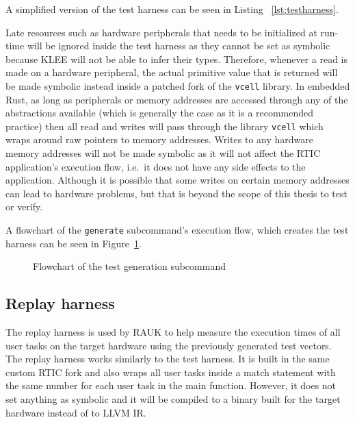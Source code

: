 A simplified version of the test harness can be seen in Listing
~\ref{lst:testharness}.



Late resources such as hardware peripherals that needs to be initialized at
run-time will be ignored inside the test harness as they cannot be set as
symbolic because KLEE will not be able to infer their types. Therefore, whenever
a read is made on a hardware peripheral, the actual primitive value that is
returned will be made symbolic instead inside a patched fork of the
\texttt{vcell} library. In embedded Rust, as long as peripherals or memory
addresses are accessed through any of the abstractions available (which is
generally the case as it is a recommended practice) then all read and writes will pass
through the library \texttt{vcell} which wraps around raw pointers to memory
addresses. Writes to any hardware memory addresses will not be made symbolic as
it will not affect the RTIC application's execution flow, i.e.\ it does not
have any side effects to the application. Although it is possible that some
writes on certain memory addresses can lead to hardware problems, but that is
beyond the scope of this thesis to test or verify.

A flowchart of the \texttt{generate} subcommand's execution flow, which creates
the test harness can be seen in Figure~\ref{fig:generatecmd}.
\begin{figure}[H]\label{fig:generatecmd}
    \centering
    \caption{Flowchart of the test generation subcommand}
\end{figure}

\subsection{Replay harness}
The replay harness is used by RAUK to help measure the execution times of all
user tasks on the target hardware using the previously generated test vectors.
The replay harness works similarly to the test harness. It is built in the same
custom RTIC fork and also wraps all user tasks inside a match statement with
the same number for each user task in the main function. However, it does not
set anything as symbolic and it will be compiled to a binary built for the
target hardware instead of to LLVM IR\@.


